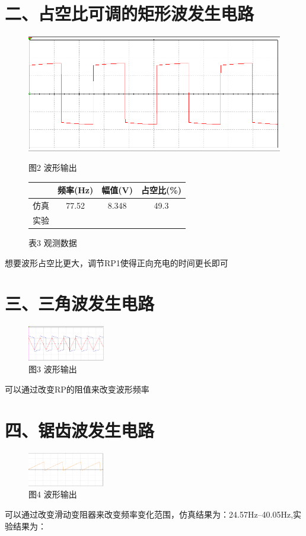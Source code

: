 \documentclass[a4paper,10pt,notitlepage]{article}
\begin{document}
	\section*{二、占空比可调的矩形波发生电路}
	\begin{figure}[h]
		\centering
		\begin{minipage}{0.3\textwidth}
			\centering
			\includegraphics[width=\textwidth]{3.png}
			\caption*{图2 波形输出}
		\end{minipage}
		\qquad
		\begin{minipage}{0.3\textwidth}
			\centering
			\begin{tabular}{|c|c|c|c|}
				\hline
				& 频率(Hz) & 幅值(V) & 占空比(\%) \\
				\hline
				仿真 & 77.52 & 8.348 & 49.3 \\
				\hline 
				实验 & \qquad & \qquad & \qquad \\
				\hline
			\end{tabular}
			\caption*{表3 观测数据}
		\end{minipage}
	\end{figure}
	想要波形占空比更大，调节RP1使得正向充电的时间更长即可
	\newpage
	\section*{三、三角波发生电路}
	\begin{figure}[h]
		\centering
		\includegraphics[width=0.3\textwidth]{4.png}
		\caption*{图3 波形输出}
	\end{figure}
	可以通过改变RP的阻值来改变波形频率
	\section*{四、锯齿波发生电路}
	\begin{figure}[h]
		\centering
		\includegraphics[width=0.3\textwidth]{5.png}
		\caption*{图4 波形输出}
	\end{figure}
可以通过改变滑动变阻器来改变频率变化范围，仿真结果为：24.57Hz--40.05Hz,实验结果为：
\end{document}
